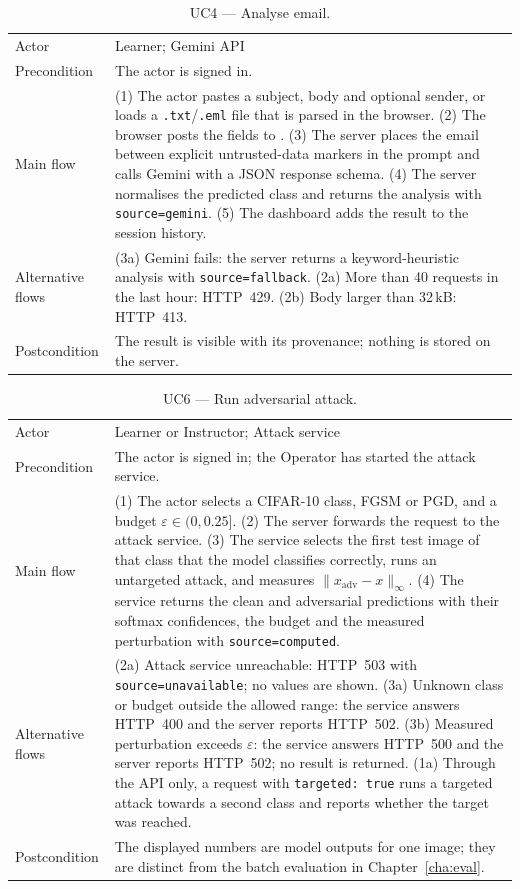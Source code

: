 \begin{table}[htbp]
\centering
\caption{UC4 --- Analyse email.}
\label{tab:uc4}
\scriptsize
\begin{tabular}{P{2.4cm}P{10.0cm}}
\toprule
Actor & Learner; Gemini API \\
Precondition & The actor is signed in. \\
Main flow & (1) The actor pastes a subject, body and optional sender, or loads a \texttt{.txt}/\texttt{.eml} file that is parsed in the browser. (2) The browser posts the fields to . (3) The server places the email between explicit untrusted-data markers in the prompt and calls Gemini with a JSON response schema. (4) The server normalises the predicted class and returns the analysis with \texttt{source=gemini}. (5) The dashboard adds the result to the session history. \\
Alternative flows & (3a) Gemini fails: the server returns a keyword-heuristic analysis with \texttt{source=fallback}. (2a) More than 40 requests in the last hour: HTTP~429. (2b) Body larger than 32\,kB: HTTP~413. \\
Postcondition & The result is visible with its provenance; nothing is stored on the server. \\
\bottomrule
\end{tabular}
\end{table}

\begin{table}[htbp]
\centering
\caption{UC6 --- Run adversarial attack.}
\label{tab:uc6}
\scriptsize
\begin{tabular}{P{2.4cm}P{10.0cm}}
\toprule
Actor & Learner or Instructor; Attack service \\
Precondition & The actor is signed in; the Operator has started the attack service. \\
Main flow & (1) The actor selects a CIFAR-10 class, FGSM or PGD, and a budget $\varepsilon \in (0, 0.25]$. (2) The server forwards the request to the attack service. (3) The service selects the first test image of that class that the model classifies correctly, runs an untargeted attack, and measures $\|x_{\mathrm{adv}} - x\|_\infty$. (4) The service returns the clean and adversarial predictions with their softmax confidences, the budget and the measured perturbation with \texttt{source=computed}. \\
Alternative flows & (2a) Attack service unreachable: HTTP~503 with \texttt{source=unavailable}; no values are shown. (3a) Unknown class or budget outside the allowed range: the service answers HTTP~400 and the server reports HTTP~502. (3b) Measured perturbation exceeds $\varepsilon$: the service answers HTTP~500 and the server reports HTTP~502; no result is returned. (1a) Through the API only, a request with \texttt{targeted: true} runs a targeted attack towards a second class and reports whether the target was reached. \\
Postcondition & The displayed numbers are model outputs for one image; they are distinct from the batch evaluation in Chapter~\ref{cha:eval}. \\
\bottomrule
\end{tabular}
\end{table}


